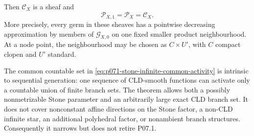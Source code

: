 \begin{theorem}
Then \(\mathcal C_X\) is a sheaf and
\begin{equation}
                 \mathcal P_{X,1}=\mathcal P_X=\mathcal C_X .
 \label{eq:p071-stone-infinite-collapse}
\end{equation}
More precisely, every germ in these sheaves has a pointwise decreasing
approximation by members of \(\mathcal G_{X,0}\) on one fixed smaller
product neighbourhood.  At a node point, the neighbourhood may be
chosen as \(C\times U'\), with \(C\) compact clopen and \(U'\) standard.

The common countable set in
\eqref{eq:p071-stone-infinite-common-activity} is intrinsic to sequential
generation: one sequence of CLD-smooth functions can activate only a
countable union of finite branch sets.  The theorem allows both a
possibly nonmetrizable Stone parameter and an arbitrarily large exact
CLD branch set.  It does not cover nonconstant affine directions on the
Stone factor, a non-CLD infinite star, an additional polyhedral factor,
or nonambient branch structures.  Consequently it narrows but does not
retire P07.1.
\end{theorem}
